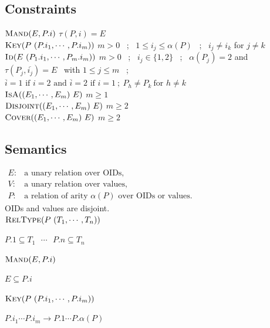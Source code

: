 \documentclass[10pt]{article}
\newcommand{\ols}[1]{\mskip.5\thinmuskip\overline{\mskip-.5\thinmuskip {#1} \mskip-.5\thinmuskip}\mskip.5\thinmuskip} %
\begin{document}

\subsection*{Constraints}

$\textsc{Mand}(E, P.i)$
\hfill { $\tau(P,i)=E$}\\
%
$\textsc{Key}(P\ (P.i_1, \cdots , P.i_m))$ \hfill{ $m>0$ ~;~ \(1\leq i_j\leq\alpha(P)\) ~;~ \(i_j\neq i_k\) for $j\neq k$}\\
%
$\textsc{Id}(E\ (P_1.i_1, \cdots , P_m.i_m))$ 
\hfill { $m>0$ ~;~ \(i_j\in\{1,2\}\) ~;~ $\alpha(P_j)=2$ and $\tau(P_j,\overline{i_j})=E$ ~with \(1\leq j\leq m\) ~;}\\
\phantom{}\hfill { $\overline{i}=1 \text{ if } i=2 \text{ and }\overline{i}=2 \text{ if } i=1 ~;~ P_h\neq P_k ~\text{for } h\neq k$}\\
%
$\textsc{IsA}((E_1,\cdots,E_m)\ E)$ \hfill{ $m\geq 1$}\\
$\textsc{Disjoint}((E_1,\cdots,E_m)\ E)$ \hfill{ $m\geq 2$}\\
$\textsc{Cover}((E_1,\cdots,E_m)\ E)$ \hfill{ $m\geq 2$}


\subsection*{Semantics}

\noindent$
\begin{array}{ll}
E: & \text{a unary relation over OIDs,}\\
V: & \text{a unary relation over values,}\\
P: & \text{a relation of arity \(\alpha(P)\) over OIDs or values.}
\end{array}
$\\
OIDs and values are disjoint.
\\

\noindent
$\textsc{RelType}(P\ (T_1, \cdots , T_n))$

$P.1\subseteq T_1 ~~~\cdots~~~ P.n\subseteq T_n$

\noindent
$\textsc{Mand}(E, P.i)$

$E\subseteq P.i$

\noindent
$\textsc{Key}(P\ (P.i_1, \cdots , P.i_m))$

$P.i_1 \cdots P.i_m\rightarrow P.1\cdots P.{\alpha(P)}$

%
\end{document}
